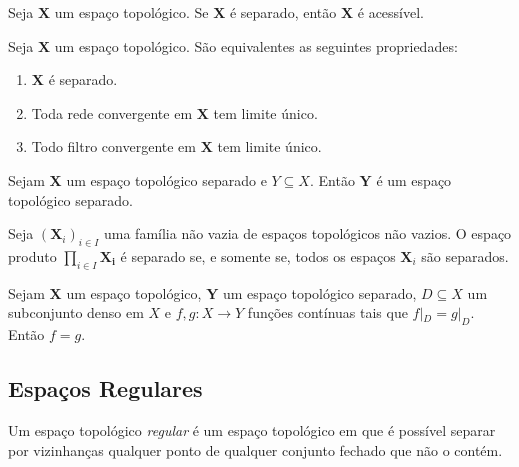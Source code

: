 \begin{prop}[$T_2 \Rightarrow T_1$]
Seja $\bm X$ um espaço topológico. Se $\bm X$ é separado, então $\bm X$ é acessível.
\end{prop}

\begin{prop}
Seja $\bm X$ um espaço topológico. São equivalentes as seguintes propriedades:
	\begin{enumerate}
	\item $\bm X$ é separado.
	\item Toda rede convergente em $\bm X$ tem limite único.
	\item Todo filtro convergente em $\bm X$ tem limite único.
	\end{enumerate}
\end{prop}

\begin{prop}
Sejam $\bm X$ um espaço topológico separado e $Y \subseteq X$. Então $\bm Y$ é um espaço topológico separado.
\end{prop}

\begin{prop}
Seja $(\bm X_i)_{i \in I}$ uma família não vazia de espaços topológicos não vazios. O espaço produto $\prod_{i \in I} \bm{X_i}$ é separado se, e somente se, todos os espaços $\bm X_i$ são separados.
\end{prop}

\begin{prop}
Sejam $\bm X$ um espaço topológico, $\bm Y$ um espaço topológico separado, $D \subseteq X$ um subconjunto denso em $X$ e $f,g: X \to Y$ funções contínuas tais que $f|_D=g|_D$. Então $f=g$.
\end{prop}

\subsection{Espaços Regulares}

\begin{defi}
Um espaço topológico \emph{regular} é um espaço topológico
em que é possível separar por vizinhanças qualquer ponto de qualquer conjunto fechado que não o contém.
\end{defi}


